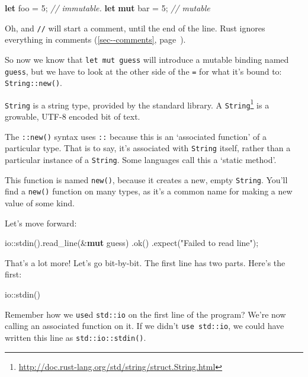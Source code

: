 \documentclass[a4paper,]{book}
\renewcommand*{\hyperref}[2][\ar]{%
  \def\ar{#2}%
  #2 (\autoref{#1}, page~\pageref{#1})}
\newenvironment{Shaded}{\begin{snugshade}}{\end{snugshade}}
\newcommand{\KeywordTok}[1]{\textcolor[rgb]{0.13,0.29,0.53}{\textbf{{#1}}}}
\newcommand{\DecValTok}[1]{\textcolor[rgb]{0.00,0.00,0.81}{{#1}}}
\newcommand{\StringTok}[1]{\textcolor[rgb]{0.31,0.60,0.02}{{#1}}}
\newcommand{\CommentTok}[1]{\textcolor[rgb]{0.56,0.35,0.01}{\textit{{#1}}}}
\newcommand{\NormalTok}[1]{{#1}}
\renewcommand{\href}[2]{#2\footnote{\url{#1}}}
\begin{document}
\begin{Shaded}
\begin{Highlighting}[]
\KeywordTok{let} \NormalTok{foo = }\DecValTok{5}\NormalTok{; }\CommentTok{// immutable.}
\KeywordTok{let} \KeywordTok{mut} \NormalTok{bar = }\DecValTok{5}\NormalTok{; }\CommentTok{// mutable}
\end{Highlighting}
\end{Shaded}

Oh, and \texttt{//} will start a comment, until the end of the line.
Rust ignores everything in \hyperref[sec--comments]{comments}.

So now we know that \texttt{let\ mut\ guess} will introduce a mutable
binding named \texttt{guess}, but we have to look at the other side of
the \texttt{=} for what it's bound to: \texttt{String::new()}.

\texttt{String} is a string type, provided by the standard library. A
\href{http://doc.rust-lang.org/std/string/struct.String.html}{\texttt{String}}
is a growable, UTF-8 encoded bit of text.

The \texttt{::new()} syntax uses \texttt{::} because this is an
`associated function' of a particular type. That is to say, it's
associated with \texttt{String} itself, rather than a particular
instance of a \texttt{String}. Some languages call this a `static
method'.

This function is named \texttt{new()}, because it creates a new, empty
\texttt{String}. You'll find a \texttt{new()} function on many types, as
it's a common name for making a new value of some kind.

Let's move forward:

\begin{Shaded}
\begin{Highlighting}[]
    \NormalTok{io::stdin().read_line(&}\KeywordTok{mut} \NormalTok{guess)}
        \NormalTok{.ok()}
        \NormalTok{.expect(}\StringTok{"Failed to read line"}\NormalTok{);}
\end{Highlighting}
\end{Shaded}

That's a lot more! Let's go bit-by-bit. The first line has two parts.
Here's the first:

\begin{Shaded}
\begin{Highlighting}[]
\NormalTok{io::stdin()}
\end{Highlighting}
\end{Shaded}

Remember how we \texttt{use}d \texttt{std::io} on the first line of the
program? We're now calling an associated function on it. If we didn't
\texttt{use\ std::io}, we could have written this line as
\texttt{std::io::stdin()}.
\end{document}
